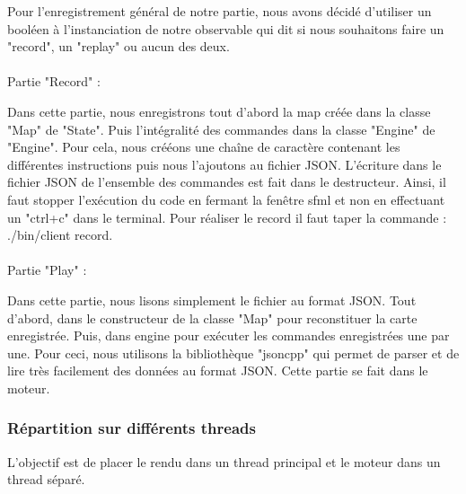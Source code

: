 \documentclass[12pt,a4paper]{article}
\begin{document}
Pour l'enregistrement général de notre partie, nous avons décidé d'utiliser un booléen à l'instanciation de notre observable qui dit si nous souhaitons faire un "record", un "replay" ou aucun des deux.\\
\\Partie "Record" :

Dans cette partie, nous enregistrons tout d'abord la map créée dans la classe "Map" de "State". Puis l'intégralité des commandes dans la classe "Engine" de "Engine". Pour cela, nous crééons une chaîne de caractère contenant les différentes instructions puis nous l'ajoutons au fichier JSON. L'écriture dans le fichier JSON de l'ensemble des commandes est fait dans le destructeur. Ainsi, il faut stopper l'exécution du code en fermant la fenêtre sfml et non en effectuant un "ctrl+c" dans le terminal. Pour réaliser le record il faut taper la commande : ./bin/client record.\\
\\Partie "Play" : 

Dans cette partie, nous lisons simplement le fichier au format JSON. Tout d'abord, dans le constructeur de la classe "Map" pour reconstituer la carte enregistrée. Puis, dans engine pour exécuter les commandes enregistrées une par une. Pour ceci, nous utilisons la bibliothèque "jsoncpp" qui permet de parser et de lire très facilement des données au format JSON. Cette partie se fait dans le moteur.

\subsubsection{Répartition sur différents threads}

L'objectif est de placer le rendu dans un thread principal et le moteur dans un thread séparé. 
\end{document}
